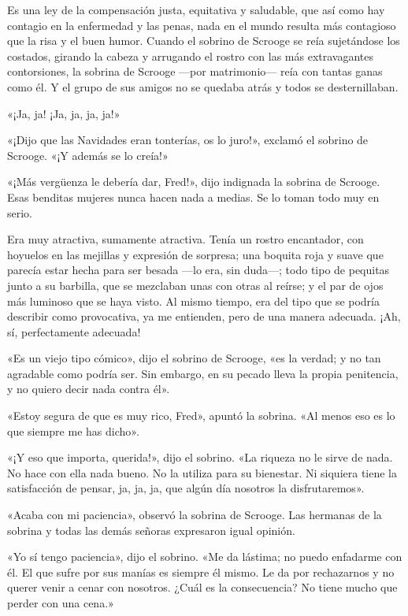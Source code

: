 \documentclass{novela}
\begin{document}
 Es una ley de la compensación justa, equitativa y saludable, que así como hay contagio en la enfermedad y las penas, nada en el mundo resulta más contagioso que la risa y el buen humor. Cuando el sobrino de Scrooge se reía sujetándose los costados, girando la cabeza y arrugando el rostro con las más extravagantes contorsiones, la sobrina de Scrooge ---por matrimonio--- reía con tantas ganas como él. Y el grupo de sus amigos no se quedaba atrás y todos se desternillaban.

 «¡Ja, ja! ¡Ja, ja, ja, ja!»

 «¡Dijo que las Navidades eran tonterías, os lo juro!», exclamó el sobrino de Scrooge. «¡Y además se lo creía!»

 «¡Más vergüenza le debería dar, Fred!», dijo indignada la sobrina de Scrooge. Esas benditas mujeres nunca hacen nada a medias. Se lo toman todo muy en serio.

 Era muy atractiva, sumamente atractiva. Tenía un rostro encantador, con hoyuelos en las mejillas y expresión de sorpresa; una boquita roja y suave que parecía estar hecha para ser besada ---lo era, sin duda---; todo tipo de pequitas junto a su barbilla, que se mezclaban unas con otras al reírse; y el par de ojos más luminoso que se haya visto. Al mismo tiempo, era del tipo que se podría describir como provocativa, ya me entienden, pero de una manera adecuada. ¡Ah, sí, perfectamente adecuada!

 «Es un viejo tipo cómico», dijo el sobrino de Scrooge, «es la verdad; y no tan agradable como podría ser. Sin embargo, en su pecado lleva la propia penitencia, y no quiero decir nada contra él».

 «Estoy segura de que es muy rico, Fred», apuntó la sobrina. «Al menos eso es lo que siempre me has dicho».

 «¡Y eso que importa, querida!», dijo el sobrino. «La riqueza no le sirve de nada. No hace con ella nada bueno. No la utiliza para su bienestar. Ni siquiera tiene la satisfacción de pensar, ja, ja, ja, que algún día nosotros la disfrutaremos».

 «Acaba con mi paciencia», observó la sobrina de Scrooge. Las hermanas de la sobrina y todas las demás señoras expresaron igual opinión.

 «Yo sí tengo paciencia», dijo el sobrino. «Me da lástima; no puedo enfadarme con él. El que sufre por sus manías es siempre él mismo. Le da por rechazarnos y no querer venir a cenar con nosotros. ¿Cuál es la consecuencia? No tiene mucho que perder con una cena.»
\end{document}
